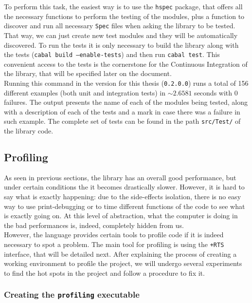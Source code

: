 To perform this task, the easiest way is to use the \texttt{hspec} package,
that offers all the necessary functions to perform the testing of the modules,
plus a function to discover and run all necessary \texttt{Spec} files when
asking the library to be tested. That way, we can just create new test modules
and they will be automatically discovered. To run the tests it is only
necessary to build the library along with the tests (\texttt{cabal build
  --enable-tests}) and then run \texttt{cabal test}. This convenient access to
the tests is the cornerstone for the Continuous Integration of the library,
that will be specified later on the document.\\

Running this command in the version for this thesis (\texttt{0.2.0.0}) runs a
total of 156 different examples (both unit and integration tests) in
$\sim 2.6581$ seconds with 0 failures. The output presents the name of each of
the modules being tested, along with a description of each of the tests and a
mark in case there was a failure in such example. The complete set of tests can
be found in the path \texttt{src/Test/} of the library code.\\

\subsection{Profiling}

As seen in previous sections, the library has an overall good performance, but
under certain conditions the it becomes drastically slower. However, it is hard
to say what is exactly happening: due to the side-effects isolation, there is
no easy way to use print-debugging or to time different functions of the code
to see what is exactly going on. At this level of abstraction, what the
computer is doing in the bad performances is, indeed, completely hidden from
us.\\

However, the language provides certain tools to profile code if it is indeed
necessary to spot a problem. The main tool for profiling is using the
\texttt{+RTS} interface, that will be detailed next. After explaining the
process of creating a working environment to profile the project, we will
undergo several experiments to find the hot spots in the project and follow a
procedure to fix it.\\

\subsubsection{Creating the \texttt{profiling} executable}


